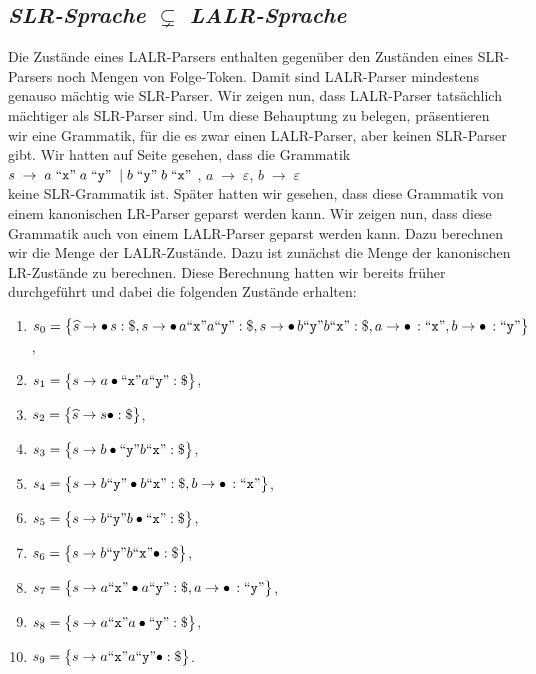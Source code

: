 \subsection{\emph{SLR-Sprache} $\subsetneq$ \emph{LALR-Sprache}}
Die Zust\"ande eines LALR-Parsers enthalten gegen\"uber den Zust\"anden eines SLR-Parsers noch
Mengen von Folge-Token.  Damit sind LALR-Parser mindestens genauso m\"achtig wie SLR-Parser.
Wir zeigen nun, dass LALR-Parser tats\"achlich m\"achtiger als SLR-Parser sind.  Um diese
Behauptung zu belegen, pr\"asentieren wir eine Grammatik, f\"ur die es zwar einen LALR-Parser,
aber keinen SLR-Parser gibt.  Wir hatten auf Seite \pageref{fig:reduce-reduce-conflict.grammar}
gesehen, dass die Grammatik
\\[0.2cm]
\hspace*{1.3cm}
$s \;\rightarrow\; a \;\mbox{``\texttt{x}''}\; a \;\mbox{``\texttt{y}''}\; \mid b \;\mbox{``\texttt{y}''}\; b \;\mbox{``\texttt{x}''}\;$, \quad
$a \;\rightarrow\;\varepsilon$, \quad
$b \;\rightarrow\; \varepsilon$
\\[0.2cm]
keine SLR-Grammatik ist.  Sp\"ater hatten wir gesehen, dass diese Grammatik von einem
kanonischen LR-Parser geparst werden kann.  Wir zeigen nun, dass diese Grammatik auch von
einem LALR-Parser geparst werden kann.  Dazu berechnen wir die Menge der LALR-Zust\"ande.
Dazu ist zun\"achst die Menge der kanonischen LR-Zust\"ande zu berechnen.  Diese Berechnung
hatten wir bereits fr\"uher durchgef\"uhrt und dabei die folgenden Zust\"ande erhalten:
\begin{enumerate}
\item $s_0  = \bigl\{ \widehat{s} \rightarrow \bullet\, s:\symbol{36},
                     s \rightarrow \bullet\, a \squoted{x} a \squoted{y}:\symbol{36},
                     s \rightarrow \bullet\, b \squoted{y} b \squoted{x}:\symbol{36},
                     a \rightarrow \bullet\,: \squoted{x},
                     b \rightarrow \bullet\,: \squoted{y}
              \bigr\}
      $,
\item $s_1 = \bigl\{ s \rightarrow a \bullet \squoted{x} a \squoted{y}:\symbol{36} \bigr\}$,
\item $s_2 = \bigl\{ \widehat{s} \rightarrow s \bullet:\symbol{36} \bigr\}$,
\item $s_3 = \bigl\{ s \rightarrow b \bullet \squoted{y} b \squoted{x}: \symbol{36} \bigr\}$,
\item $s_4 = \bigl\{ s \rightarrow b \squoted{y} \bullet b \squoted{x}: \symbol{36},
                     b \rightarrow \bullet\,: \squoted{x}
             \bigr\}
      $,
\item $s_5 = \bigl\{ s \rightarrow b \squoted{y} b \bullet \squoted{x}: \symbol{36} \bigr\}$,
\item $s_6 = \bigl\{ s \rightarrow b \squoted{y} b \squoted{x} \bullet: \symbol{36} \bigr\}$,
\item $s_7 = \bigl\{ s \rightarrow a \squoted{x} \bullet a \squoted{y}:\symbol{36},
                     a \rightarrow \bullet\,: \squoted{y}
              \bigr\}
      $,
\item $s_8 = \bigl\{ s \rightarrow a \squoted{x} a \bullet \squoted{y}:\symbol{36} \bigr\}$,
\item $s_9 = \bigl\{ s \rightarrow a \squoted{x} a \squoted{y} \bullet :\symbol{36} \bigr\}$.
\end{enumerate}
